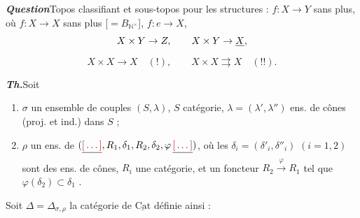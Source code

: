 \documentclass[11pt,a4paper]{article}
\begin{document}
\textbf{\emph{Question}}\quad Topos classifiant et sous-topos pour les
structures : $f : X \to Y$ sans plus, où $f : X \to X$ sans plus
[$= B_{\mathbb{N}^{\times}}$], $f : e \to X$,
\[
  X \times Y \to Z, \qquad X \times Y \to \struck{X},
\]
\[
  X \times X \longrightarrow X \quad (!), \qquad
  X \times X \rightrightarrows X \quad (!!) .
\]



\textbf{\emph{Th.}}\quad Soit

\begin{enumerate}
  \item[1)] $\sigma$ un ensemble de couples $(S, \lambda)$, $S$ catégorie,
    $\lambda = (\lambda', \lambda'')$ ens. de cônes (proj. et ind.) dans $S$ ;
  \item[2)] $\rho$ un ens. de  
    $(\struck{\ill{}}, R_{1}, \delta_{1}, R_{2}, \delta_{2},
    \varphi\,\struck{\ill{}})$, où les $\delta_{i} = (\delta'_{i},
    \delta''_{i})$ $(i = 1, 2)$ sont des ens. de cônes, $R_{i}$ une catégorie,
     et un foncteur
    $R_{2} \xrightarrow{\varphi} R_{1}$ tel  que
    $\varphi(\delta_{2}) \subset \delta_{1}$
    .
\end{enumerate}

Soit $\Delta = \Delta_{\sigma,\rho}$ la catégorie de
$\underline{\mathrm{Cat}}$ définie ainsi :
\end{document}
